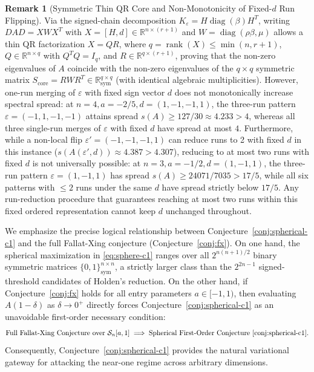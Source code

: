 \documentclass[11pt,reqno]{article}
\theoremstyle{definition}
\newtheorem{remark}[theorem]{Remark}
\newcommand{\R}{\mathbb{R}}
\begin{document}
\begin{itemize}
    \begin{remark}[Symmetric Thin QR Core and Non-Monotonicity of Fixed-$d$ Run Flipping]\label{rem:run-elim-counter}
    Via the signed-chain decomposition $K_\varepsilon = H \operatorname{diag}(\beta) H^T$, writing $D A D = X W X^T$ with $X = [H, d] \in \R^{n \times (r+1)}$ and $W = \operatorname{diag}(\rho \beta, \mu)$ allows a thin QR factorization $X = Q R$, where $q = \operatorname{rank}(X) \le \min(n, r+1)$, $Q \in \R^{n \times q}$ with $Q^T Q = I_q$, and $R \in \R^{q \times (r+1)}$, proving that the non-zero eigenvalues of $A$ coincide with the non-zero eigenvalues of the $q \times q$ symmetric matrix $S_{\mathrm{core}} = R W R^T \in \R^{q \times q}_{\mathrm{sym}}$ (with identical algebraic multiplicities).
    However, one-run merging of $\varepsilon$ with fixed sign vector $d$ does not monotonically increase spectral spread: at $n=4, a=-2/5, d=(1, -1, -1, 1)$, the three-run pattern $\varepsilon=(-1, 1, -1, -1)$ attains spread $s(A) \ge 127/30 \approx 4.233 > 4$, whereas all three single-run merges of $\varepsilon$ with fixed $d$ have spread at most $4$. Furthermore, while a non-local flip $\varepsilon'=(-1,-1,-1,1)$ can reduce runs to 2 with fixed $d$ in this instance ($s(A(\varepsilon', d)) \approx 4.387 > 4.307$), reducing to at most two runs with fixed $d$ is not universally possible: at $n=3, a=-1/2, d=(1,-1,1)$, the three-run pattern $\varepsilon=(1,-1,1)$ has spread $s(A) \ge 24071/7035 > 17/5$, while all six patterns with $\le 2$ runs under the same $d$ have spread strictly below $17/5$. Any run-reduction procedure that guarantees reaching at most two runs within this fixed ordered representation cannot keep $d$ unchanged throughout.
    \end{remark}
    We emphasize the precise logical relationship between Conjecture~\ref{conj:spherical-c1} and the full Fallat-Xing conjecture (Conjecture~\ref{conj:fx}). On one hand, the spherical maximization in \eqref{eq:sphere-c1} ranges over all $2^{n(n+1)/2}$ binary symmetric matrices $\{0, 1\}^{n \times n}_{\mathrm{sym}}$, a strictly larger class than the $2^{2n-1}$ signed-threshold candidates of Holden's reduction. On the other hand, if Conjecture~\ref{conj:fx} holds for all entry parameters $a \in [-1, 1)$, then evaluating $A(1-\delta)$ as $\delta \to 0^+$ directly forces Conjecture~\ref{conj:spherical-c1} as an unavoidable first-order necessary condition:
    \begin{equation}
    \text{Full Fallat-Xing Conjecture over } \mathcal{S}_n[a, 1] \implies \text{Spherical First-Order Conjecture~\ref{conj:spherical-c1}}.
    \end{equation}
    Consequently, Conjecture~\ref{conj:spherical-c1} provides the natural variational gateway for attacking the near-one regime across arbitrary dimensions.


\end{itemize}
\end{document}
